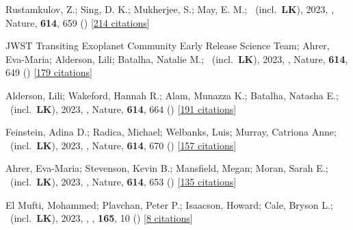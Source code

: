 \item[{\color{numcolor}\scriptsize84}] Rustamkulov, Z.; Sing, D. K.; Mukherjee, S.; May, E. M.; \etal\ (incl.\ \textbf{LK}), 2023, , Nature, \textbf{614}, 659 () [\href{https://ui.adsabs.harvard.edu/abs/2023Natur.614..659R}{214 citations}]

\item[{\color{numcolor}\scriptsize83}] JWST Transiting Exoplanet Community Early Release Science Team; Ahrer, Eva-Maria; Alderson, Lili; Batalha, Natalie M.; \etal\ (incl.\ \textbf{LK}), 2023, , Nature, \textbf{614}, 649 () [\href{https://ui.adsabs.harvard.edu/abs/2023Natur.614..649J}{179 citations}]

\item[{\color{numcolor}\scriptsize82}] Alderson, Lili; Wakeford, Hannah R.; Alam, Munazza K.; Batalha, Natasha E.; \etal\ (incl.\ \textbf{LK}), 2023, , Nature, \textbf{614}, 664 () [\href{https://ui.adsabs.harvard.edu/abs/2023Natur.614..664A}{191 citations}]

\item[{\color{numcolor}\scriptsize81}] Feinstein, Adina D.; Radica, Michael; Welbanks, Luis; Murray, Catriona Anne; \etal\ (incl.\ \textbf{LK}), 2023, , Nature, \textbf{614}, 670 () [\href{https://ui.adsabs.harvard.edu/abs/2023Natur.614..670F}{157 citations}]

\item[{\color{numcolor}\scriptsize80}] Ahrer, Eva-Maria; Stevenson, Kevin B.; Mansfield, Megan; Moran, Sarah E.; \etal\ (incl.\ \textbf{LK}), 2023, , Nature, \textbf{614}, 653 () [\href{https://ui.adsabs.harvard.edu/abs/2023Natur.614..653A}{135 citations}]

\item[{\color{numcolor}\scriptsize79}] El Mufti, Mohammed; Plavchan, Peter P.; Isaacson, Howard; Cale, Bryson L.; \etal\ (incl.\ \textbf{LK}), 2023, , \aj, \textbf{165}, 10 () [\href{https://ui.adsabs.harvard.edu/abs/2023AJ....165...10E}{8 citations}]

